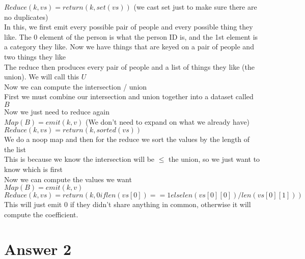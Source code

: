 \documentclass[11pt]{article}
\theoremstyle{definition}
\begin{document}
$Reduce(k, vs) = return (k, set(vs))$ (we cast set just to make sure there are no duplicates)\\
In this, we first emit every possible pair of people and every possible thing they like.  The 0 element of the person is what the person ID is, and the 1st element is a category they like.  Now we have things that are keyed on a pair of people and two things they like\\
The reduce then produces every pair of people and a list of things they like (the union).  We will call this $U$\\
\newline
Now we can compute the intersection / union\\
First we must combine our intersection and union together into a dataset called $B$\\
Now we just need to reduce again\\
$Map(B) = emit(k, v)$ (We don't need to expand on what we already have)\\
$Reduce(k, vs) = return(k, sorted(vs))$\\
We do a noop map and then for the reduce we sort the values by the length of the list\\
This is because we know the intersection will be $\le$ the union, so we just want to know which is first\\
Now we can compute the values we want\\
$Map(B) = emit(k, v)$\\
$Reduce(k, vs) = return(k, 0 if len(vs[0]) == 1 else  len(vs[0][0]) / len(vs[0][1]))$\\
This will just emit 0 if they didn't share anything in common, otherwise it will compute the coefficient.


\section*{Answer 2}
\end{document}
